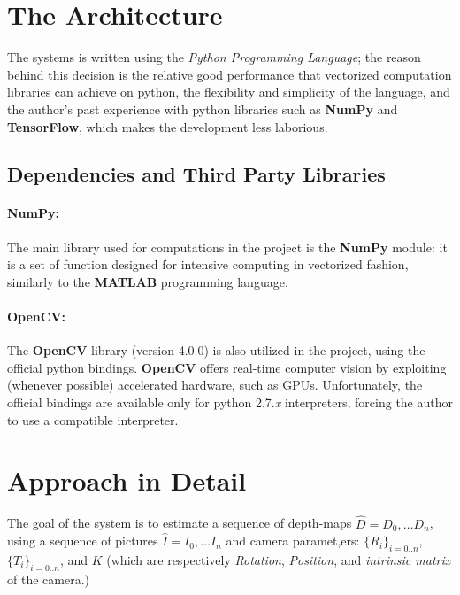 \documentclass[notitlepage,english]{hgbreport}
\begin{document}
\section{The Architecture}
The systems is written using the \emph{Python Programming Language}; the reason behind this decision is the relative good performance that vectorized computation libraries can achieve on python, the flexibility and simplicity of the language, and the author's past experience with python libraries such as \textbf{NumPy} and \textbf{TensorFlow}, which makes the development less laborious.

\subsection{Dependencies and Third Party Libraries}
\paragraph{NumPy:} The main library used for computations in the project is the \textbf{NumPy} module: it is a set of function designed for intensive computing in vectorized fashion, similarly to the \textbf{MATLAB} programming language.

\paragraph{OpenCV:}
The \textbf{OpenCV} library (version 4.0.0) is also utilized in the project, using the official python bindings.
\textbf{OpenCV} offers real-time computer vision by exploiting (whenever possible) accelerated hardware, such as GPUs.
Unfortunately, the official bindings are available only for python 2.7.\textit{x} interpreters, forcing the author to use a compatible interpreter.




\section{Approach in Detail}
 
 The goal of the system is to estimate a sequence of depth-maps $\hat D = D_0, \dots D_n$, using a sequence of pictures $\hat I = I_0, \dots I_n$ and camera paramet,ers: $\{R_i\}_{i=0..n}$, $\{T_i\}_{i=0..n}$, and $K$ (which are respectively  \emph{Rotation}, \emph{Position}, and \emph{intrinsic matrix} of the camera.)
 
\end{document}
